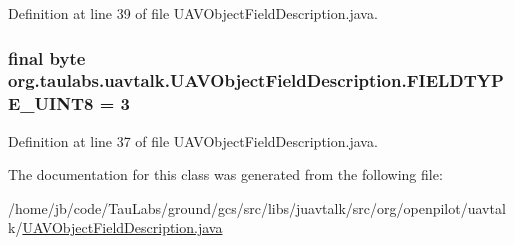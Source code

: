 \-Definition at line 39 of file \-U\-A\-V\-Object\-Field\-Description.\-java.

\hypertarget{classorg_1_1taulabs_1_1uavtalk_1_1_u_a_v_object_field_description_a35a1cfdb03119d8107d7d16e92821b1b}{
\subsubsection[{\-F\-I\-E\-L\-D\-T\-Y\-P\-E\-\_\-\-U\-I\-N\-T8}]{\setlength{\rightskip}{0pt plus 5cm}final byte {\bf org.\-taulabs.\-uavtalk.\-U\-A\-V\-Object\-Field\-Description.\-F\-I\-E\-L\-D\-T\-Y\-P\-E\-\_\-\-U\-I\-N\-T8} = 3}}\label{classorg_1_1taulabs_1_1uavtalk_1_1_u_a_v_object_field_description_a35a1cfdb03119d8107d7d16e92821b1b}


\-Definition at line 37 of file \-U\-A\-V\-Object\-Field\-Description.\-java.



\-The documentation for this class was generated from the following file\-:\begin{DoxyCompactItemize}
\item 
/home/jb/code/\-Tau\-Labs/ground/gcs/src/libs/juavtalk/src/org/openpilot/uavtalk/\hyperlink{_u_a_v_object_field_description_8java}{\-U\-A\-V\-Object\-Field\-Description.\-java}\end{DoxyCompactItemize}
